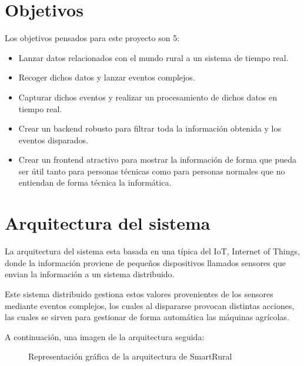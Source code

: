 \documentclass[a4paper,12pt]{article}
\begin{document}
\section{Objetivos}
Los objetivos pensados para este proyecto son 5:
\begin{itemize}
  \item Lanzar datos relacionados con el mundo rural a un sistema de tiempo real.
  \item Recoger dichos datos y lanzar eventos complejos.
  \item Capturar dichos eventos y realizar un procesamiento de dichos datos en tiempo real.
  \item Crear un backend robusto para filtrar toda la información obtenida y los eventos disparados.
  \item Crear un frontend atractivo para mostrar la información de forma que pueda ser útil tanto
        para personas técnicas como para personas normales que no entiendan de forma técnica la
        informática.
\end{itemize}

\section{Arquitectura del sistema}
La arquitectura del sistema esta basada en una típica del IoT, Internet of Things, donde la información proviene
de pequeños dispositivos llamados sensores que envian la información a un sistema distribuido.

Este sistema distribuido gestiona estos valores provenientes de los sensores mediante eventos complejos,
los cuales al dispararse provocan distintas acciones, las cuales se sirven para gestionar de forma automática
las máquinas agrícolas.

A continuación, una imagen de la arquitectura seguida:

\begin{figure}[ht]
  \caption{Representación gráfica de la arquitectura de SmartRural}
  \label{fig:arquitectura}
\end{figure}
\end{document}
